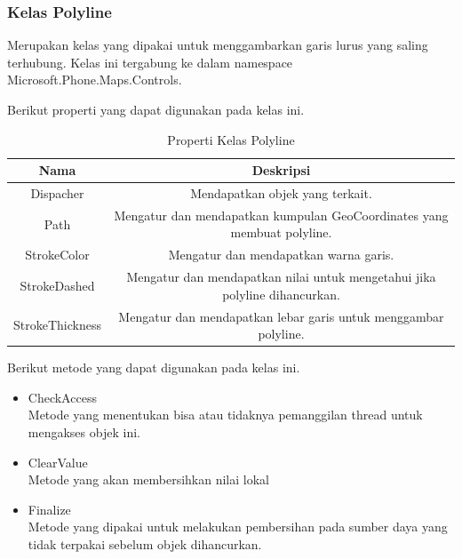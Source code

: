 \subsubsection{Kelas Polyline}
\label{subsubsec:Kelas Polyline}
\hspace{0.5cm} Merupakan kelas yang dipakai untuk menggambarkan garis lurus yang saling terhubung. Kelas ini tergabung ke dalam namespace  Microsoft.Phone.Maps.Controls. 

Berikut properti yang dapat digunakan pada kelas ini.
\begin{table}[h]
	\centering
		\begin{tabular}{ |c|c|}
				\hline
					Nama & Deskripsi \\ \hline
					Dispacher & Mendapatkan objek yang terkait. \\ \hline
					Path & Mengatur dan mendapatkan kumpulan GeoCoordinates yang membuat polyline. \\ \hline
					StrokeColor & Mengatur dan mendapatkan warna garis. \\ \hline
					StrokeDashed & Mengatur dan mendapatkan nilai untuk mengetahui jika polyline dihancurkan. \\ \hline
					StrokeThickness & Mengatur dan mendapatkan lebar garis untuk menggambar polyline. \\ \hline
				\hline
		\end{tabular}
	\caption{Properti Kelas Polyline}
	\label{tab:PropertiKelasPolyline}
\end{table}

Berikut metode yang dapat digunakan pada kelas ini.
\begin{itemize}
	\item CheckAccess\\
	Metode yang menentukan bisa atau tidaknya pemanggilan thread untuk mengakses objek ini.
	\item ClearValue\\
	Metode yang akan membersihkan nilai lokal
	\item Finalize \\
	Metode yang dipakai untuk melakukan pembersihan pada sumber daya yang tidak terpakai sebelum objek dihancurkan.
\end{itemize}

